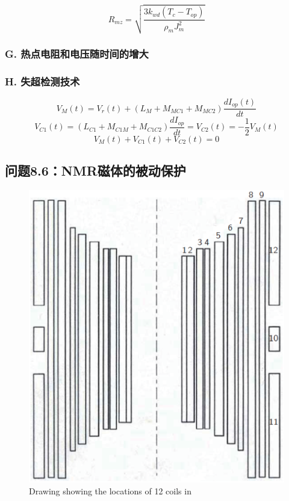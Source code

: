 {\begin{equation}%
R_{mz}=\sqrt{\frac{3k_{wd}(T_c-T_{op})}{\rho_mJ_{m}^{2}}}
\end{equation}


\subsubsection*{G. 热点电阻和电压随时间的增大}



\subsubsection*{H. 失超检测技术}


\begin{equation}%
V_M(t)=V_r(t)+(L_M+M_{MC1}+M_{MC2})\frac{dI_{op}(t)}{dt}
\end{equation}
\begin{equation}%
V_{C1}(t)=(L_{C1}+M_{C1M}+M_{C1C2})\frac{dI_{op}}{dt}=V_{C2}(t)=-\frac{1}{2}V_M(t)
\end{equation}
\begin{equation}%
V_M(t)+V_{C1}(t)+V_{C2}(t)=0
\end{equation}



\subsection{问题8.6：NMR磁体的被动保护}


\begin{figure}
	\centering
	\includegraphics[scale=0.6]{chpt8/figs/fig8.26.eps}
	\caption{Drawing showing the locations of 12 coils in }
\end{figure}


}
